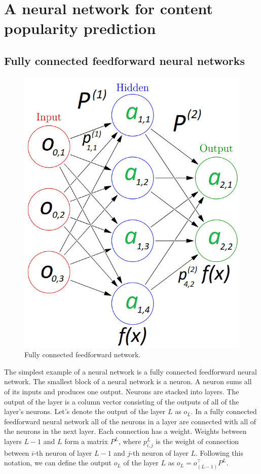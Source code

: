 \section{A neural network for content popularity prediction} \label{neural_network}

\subsection{Fully connected feedforward neural networks} \label{feedforward_nn}

\begin{figure}[b!]
	\centering
	\includegraphics[totalheight=7cm]{pics/nn_1.png}
	\caption{Fully connected feedforward network.}
	\label{fig:nn1}
\end{figure}

The simplest example of a neural network is a fully connected feedforward neural network. The smallest block of a neural network is a neuron. A neuron sums all of its inputs and produces one output. Neurons are stacked into layers. The output of the layer is a column vector consisting of the outputs of all of the layer's neurons. Let's denote the output of the layer $L$ as $o_L$. In a fully connected feedforward neural network all of the neurons in a layer are connected with all of the neurons in the next layer. Each connection has a weight. Weights between layers $ L - 1 $ and $ L  $ form a matrix $ P^L $, where $ p^{L}_{i,j}$ is the weight of connection between $i$-th neuron  of layer $L - 1$ and $j$-th neuron of layer $L$. Following this notation, we can define the output $o_L$ of the layer $L$ as $o_L = o^{\intercal}_{(L-1)} P^L$.


